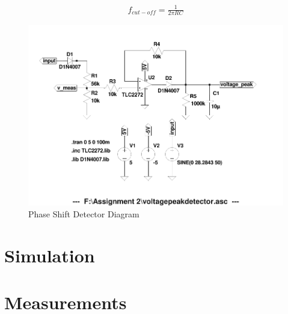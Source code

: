 \begin{align}
    f_{cut-off}=\frac{1}{2\pi RC}
   \label{eq:opampgain}
\end{align}

\begin{figure}[h!]
    \centering
    \includegraphics[width = 0.65\linewidth]{Figures/voltagepeakdetector.pdf}
        \caption{Phase Shift Detector Diagram}
    \label{fig:phaseshiftdetector.pdf}
\end{figure}

\section{Simulation} \label{sec:simulation_linear}

\section{Measurements} \label{sec:measurements_linear}








